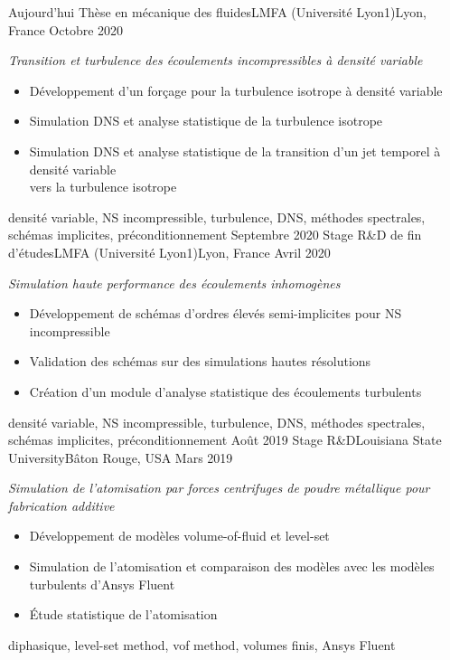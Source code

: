 \documentclass[alternative]{yaac-another-awesome-cv}
\begin{document}
\begin{experiences}
  \experience
    {Aujourd'hui}
    {Thèse en mécanique des fluides}{LMFA (Université Lyon1)}{Lyon, France}
    {Octobre 2020}
    {
      \textit{Transition et turbulence des écoulements incompressibles à densité variable}
      \begin{itemize}
        \item Développement d'un forçage pour la turbulence isotrope à densité variable
        \item Simulation DNS et analyse statistique de la turbulence isotrope
        \item Simulation DNS et analyse statistique de la transition d'un jet temporel à densité variable\\
              vers la turbulence isotrope
      \end{itemize}
    }
    {
      densité variable,
      NS incompressible,
      turbulence,
      DNS,
      méthodes spectrales,
      schémas implicites,
      préconditionnement
    }
  \emptySeparator
  \experience
    {Septembre 2020}
    {Stage R\&D de fin d'études}{LMFA (Université Lyon1)}{Lyon, France}
    {Avril 2020}
    {
      \textit{Simulation haute performance des écoulements inhomogènes}
      \begin{itemize}
        \item Développement de schémas d'ordres élevés semi-implicites pour NS incompressible
        \item Validation des schémas sur des simulations hautes résolutions
        \item Création d'un module d'analyse statistique des écoulements turbulents
      \end{itemize}
    }
    {
      densité variable,
      NS incompressible,
      turbulence,
      DNS,
      méthodes spectrales,
      schémas implicites,
      préconditionnement
    }
  \emptySeparator
  \experience
    {Août 2019}
    {Stage R\&D}{Louisiana State University}{Bâton Rouge, USA}
    {Mars 2019}
    {
      \textit{Simulation de l'atomisation par forces centrifuges de poudre métallique pour fabrication additive}
      \begin{itemize}
        \item Développement de modèles volume-of-fluid et level-set
        \item Simulation de l'atomisation et comparaison des modèles avec les modèles turbulents d'Ansys Fluent
        \item Étude statistique de l'atomisation
      \end{itemize}
    }
    {
      diphasique,
      level-set method,
      vof method,
      volumes finis,
      Ansys Fluent
    }

\end{experiences}
\end{document}
